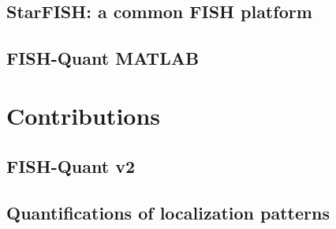 ~\cite{khater_caveolae_2019}

\subsection{StarFISH: a common \ac{FISH} platform}

\subsection{FISH-Quant MATLAB}


\section{Contributions}


\subsection{FISH-Quant v2}

\subsection{Quantifications of localization patterns}

